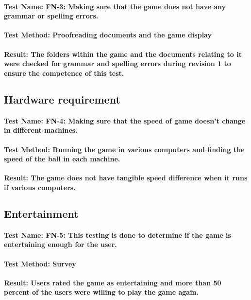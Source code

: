 \documentclass[12pt, titlepage]{article}
\begin{document}
\paragraph {Test Name: FN-3: Making sure that the game does not have any grammar or spelling errors.}
\paragraph {Test Method: Proofreading documents and the game display}
\paragraph {Result: The folders within the game and the documents relating to it were checked for grammar and spelling errors during revision 1 to ensure the competence of this test.}

\subsection	{Hardware requirement}
\paragraph {Test Name: FN-4: Making sure that the speed of game doesn’t change in diﬀerent machines.}
\paragraph {Test Method: Running the game in various computers and finding the speed of the ball in each machine.}
\paragraph {Result: The game does not have tangible speed difference when it runs if various computers.}

\subsection	{ Entertainment}
\paragraph {Test Name: FN-5: This testing is done to determine if the game is entertaining enough for the user.}
\paragraph {Test Method: Survey}
\paragraph {Result: Users rated the game as entertaining and more than 50 percent of the users were willing to play the game again.}
\end{document}
